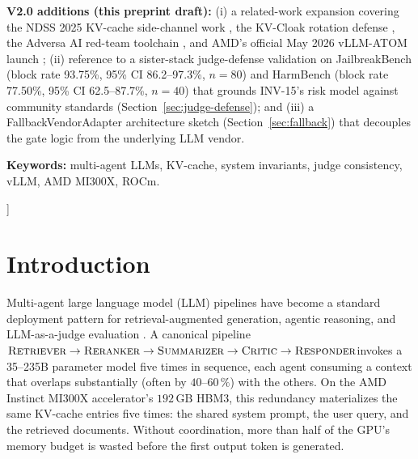\documentclass[10pt,twocolumn]{article}
\begin{document}
\begin{onecolabstract}
    \vspace{0.5em}
    \noindent\textbf{V2.0 additions (this preprint draft):}
    (i) a related-work expansion covering the NDSS 2025 KV-cache
    side-channel work \cite{kvcacheleak}, the KV-Cloak rotation defense
    \cite{kvcloak}, the Adversa AI red-team toolchain \cite{adversa},
    and AMD's official May 2026 vLLM-ATOM launch \cite{amdvllmatom};
    (ii) reference to a sister-stack judge-defense validation on
    JailbreakBench \cite{jailbreakbench}
    (block rate 93.75\%, 95\% CI 86.2--97.3\%, $n=80$) and HarmBench
    \cite{harmbench}
    (block rate 77.50\%, 95\% CI 62.5--87.7\%, $n=40$) that grounds INV-15's risk model
    against community standards (Section~\ref{sec:judge-defense});
    and (iii) a FallbackVendorAdapter architecture sketch
    (Section~\ref{sec:fallback}) that decouples the gate logic from
    the underlying LLM vendor.

    \vspace{0.5em}
    \noindent\textbf{Keywords:} multi-agent LLMs, KV-cache, system
    invariants, judge consistency, vLLM, AMD MI300X, ROCm.
    \vspace{1em}
  \end{onecolabstract}
]

\section{Introduction}
\label{sec:intro}

Multi-agent large language model (LLM) pipelines have become a standard
deployment pattern for retrieval-augmented generation, agentic reasoning, and
LLM-as-a-judge evaluation
\cite{kvcomm,tokendance,specdecode}. A
canonical pipeline\textemdash $\textsc{Retriever} \rightarrow
\textsc{Reranker} \rightarrow \textsc{Summarizer} \rightarrow \textsc{Critic}
\rightarrow \textsc{Responder}$\textemdash invokes a 35--235B parameter model
five times in sequence, each agent consuming a context that overlaps
substantially (often by $40$--$60\,\%$) with the others. On the AMD Instinct
MI300X accelerator's $192\,\mathrm{GB}$ HBM3, this redundancy materializes
the same KV-cache entries five times: the shared system prompt, the user
query, and the retrieved documents. Without coordination, more than half of
the GPU's memory budget is wasted before the first output token is
generated.
\end{document}

